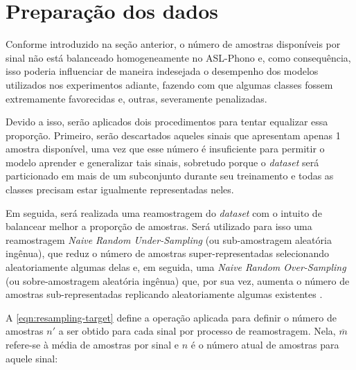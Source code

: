 \section{Preparação dos dados}
\label{sec:metodos-preparacao-dataset}


Conforme introduzido na seção anterior, o número de amostras disponíveis por sinal não está balanceado homogeneamente no ASL-Phono e, como consequência, isso poderia influenciar de maneira indesejada o desempenho dos modelos utilizados nos experimentos adiante, fazendo com que algumas classes fossem extremamente favorecidas e, outras, severamente penalizadas.


Devido a isso, serão aplicados dois procedimentos para tentar equalizar essa proporção. Primeiro, serão descartados aqueles sinais que apresentam apenas 1 amostra disponível, uma vez que esse número é insuficiente para permitir o modelo aprender e generalizar tais sinais, sobretudo porque o \textit{dataset} será particionado em mais de um subconjunto durante seu treinamento e todas as classes precisam estar igualmente representadas neles.

Em seguida, será realizada uma reamostragem do \textit{dataset} com o intuito de balancear melhor a proporção de amostras.
Será utilizado para isso uma reamostragem \textit{Naive Random Under-Sampling} (ou sub-amostragem aleatória ingênua), que reduz o número de amostras super-representadas selecionando aleatoriamente algumas delas e, em seguida, uma \textit{Naive Random Over-Sampling} (ou sobre-amostragem aleatória ingênua) que, por sua vez, aumenta o número de amostras sub-representadas replicando aleatoriamente algumas existentes \cite{he-2013-imbalanced}.

A \autoref{eqn:resampling-target} define a operação aplicada para definir o número de amostras \(n'\) a ser obtido para cada sinal por processo de reamostragem. Nela, \(\overline{m}\) refere-se à média de amostras por sinal e \(n\) é o número atual de amostras para aquele sinal:

